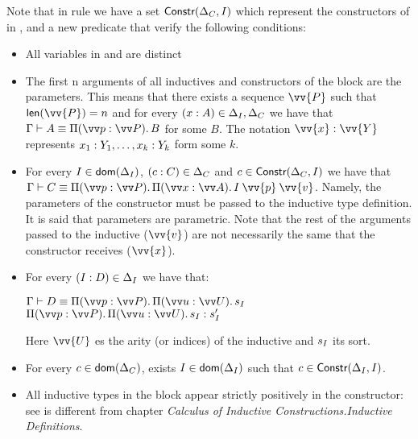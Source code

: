 Note that in \CicIndWf{} rule we have a set $\textsf{Constr}(\Delta_{C},I)$ which represent the constructors
of \IN{} in \IndContextC{}, and a new predicate 
\IndCheck{} that verify the following conditions:
\begin{itemize}
\item All variables in \IndContextT{} and \IndContextC{} are distinct

\item The first n arguments of all inductives and constructors of the block are the parameters. This means that 
there exists a sequence $\vv{\IP}$ such that $\textsf{len}(\vv{\IP})=n$ and for every
\mbox{$(x:A)\in\Delta_{I},\Delta_{C}$} we have that 
$\convertible{A}{\vvDepArrow{\IPN}{\IP}{B}}$ for some $B$. The notation $\typing{\vv{x}}{\vv{Y}}$ represents
$x_1:Y_1,\dots,x_k:Y_k$ form some $k$.

\item For every $I\in\textsf{dom}(\Delta_{I})$,
$(c:C)\in\Delta_{C}$ and $c\in\textsf{Constr}(\Delta_{C},I)$ we have that 
$\convertible{\CT}{\vvDepArrow{\IPN}{\IP}{\vvDepArrow{x}{A}{\app{\IN}{\vv{\IPN}}{\vv{v}}}}}$. Namely,
the parameters of the constructor must be passed to the inductive type definition. It is said that parameters are 
parametric. Note that the rest of the arguments passed to the inductive ($\vv{v}$) are not necessarily the same 
that the constructor receives ($\vv{x}$).

\item For every $(I:D)\in\Delta_{I}$ we have that:
\begin{center}
$\convertible{\IT}{\vvDepArrow{\IPN}{\IP}{\vvDepArrow{\IIN}{\II}{s_{\IN}}}}$
\hspace{1em}
$\typing{\vvDepArrow{\IPN}{\IP}{\vvDepArrow{\IIN}{\II}{s_{\IN}}}}{s'_{\IN}}$
\end{center}
Here $\vv{\II}$ es the arity (or indices) of the inductive and $s_{I}$ its sort.

\item For every $c\in\textsf{dom}(\Delta_{C})$, exists $I\in\textsf{dom}(\Delta_{I})$ such that 
$c\in\textsf{Constr}(\Delta_{I},I)$.

\item All inductive types in the block appear strictly positively in the constructor:  see \cite{timanySozeau:Consistency-pCuIC} is different from \cite{coqRef} 
chapter \emph{Calculus of Inductive Constructions.Inductive Definitions}.
\end{itemize}

